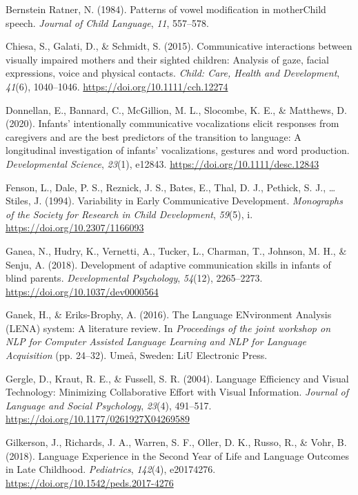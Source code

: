 \documentclass[english,man]{apa6}
\begin{document}
\leavevmode\hypertarget{ref-bernsteinratner1984}{}%
Bernstein Ratner, N. (1984). Patterns of vowel modification in motherChild speech. \emph{Journal of Child Language}, \emph{11}, 557--578.

\leavevmode\hypertarget{ref-chiesa2015}{}%
Chiesa, S., Galati, D., \& Schmidt, S. (2015). Communicative interactions between visually impaired mothers and their sighted children: Analysis of gaze, facial expressions, voice and physical contacts. \emph{Child: Care, Health and Development}, \emph{41}(6), 1040--1046. \url{https://doi.org/10.1111/cch.12274}

\leavevmode\hypertarget{ref-donnellan2020}{}%
Donnellan, E., Bannard, C., McGillion, M. L., Slocombe, K. E., \& Matthews, D. (2020). Infants' intentionally communicative vocalizations elicit responses from caregivers and are the best predictors of the transition to language: A longitudinal investigation of infants' vocalizations, gestures and word production. \emph{Developmental Science}, \emph{23}(1), e12843. \url{https://doi.org/10.1111/desc.12843}

\leavevmode\hypertarget{ref-fenson1994}{}%
Fenson, L., Dale, P. S., Reznick, J. S., Bates, E., Thal, D. J., Pethick, S. J., \ldots{} Stiles, J. (1994). Variability in Early Communicative Development. \emph{Monographs of the Society for Research in Child Development}, \emph{59}(5), i. \url{https://doi.org/10.2307/1166093}

\leavevmode\hypertarget{ref-ganea2018}{}%
Ganea, N., Hudry, K., Vernetti, A., Tucker, L., Charman, T., Johnson, M. H., \& Senju, A. (2018). Development of adaptive communication skills in infants of blind parents. \emph{Developmental Psychology}, \emph{54}(12), 2265--2273. \url{https://doi.org/10.1037/dev0000564}

\leavevmode\hypertarget{ref-ganek2016}{}%
Ganek, H., \& Eriks-Brophy, A. (2016). The Language ENvironment Analysis (LENA) system: A literature review. In \emph{Proceedings of the joint workshop on NLP for Computer Assisted Language Learning and NLP for Language Acquisition} (pp. 24--32). Umeå, Sweden: LiU Electronic Press.

\leavevmode\hypertarget{ref-gergle2004}{}%
Gergle, D., Kraut, R. E., \& Fussell, S. R. (2004). Language Efficiency and Visual Technology: Minimizing Collaborative Effort with Visual Information. \emph{Journal of Language and Social Psychology}, \emph{23}(4), 491--517. \url{https://doi.org/10.1177/0261927X04269589}

\leavevmode\hypertarget{ref-gilkerson2018}{}%
Gilkerson, J., Richards, J. A., Warren, S. F., Oller, D. K., Russo, R., \& Vohr, B. (2018). Language Experience in the Second Year of Life and Language Outcomes in Late Childhood. \emph{Pediatrics}, \emph{142}(4), e20174276. \url{https://doi.org/10.1542/peds.2017-4276}
\end{document}
